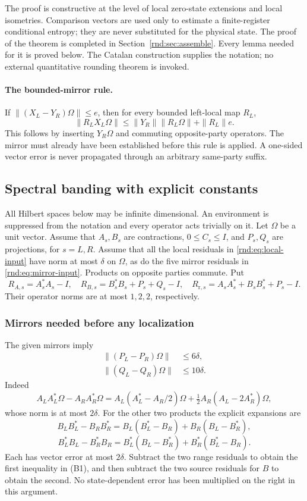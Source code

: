The proof is constructive at the level of local zero-state extensions and local isometries. Comparison vectors are used only to estimate a finite-register conditional entropy; they are never substituted for the physical state. The proof of the theorem is completed in Section~\ref{rnd:sec:assemble}. Every lemma needed for it is proved below. The Catalan construction supplies the notation; no external quantitative rounding theorem is invoked.

\paragraph{The bounded-mirror rule.}
If $\|(X_L-Y_R)\Omega\|\le e$, then for every bounded left-local map $R_L$,
\[
 \|R_LX_L\Omega\|\le\|Y_R\|\|R_L\Omega\|+\|R_L\|e.
\]
This follows by inserting $Y_R\Omega$ and commuting opposite-party operators. The mirror must already have been established before this rule is applied. A one-sided vector error is never propagated through an arbitrary same-party suffix.

\subsection{Spectral banding with explicit constants}
\label{rnd:sec:bands-explicit}

All Hilbert spaces below may be infinite dimensional.  An environment is
suppressed from the notation and every operator acts trivially on it.  Let
$\Omega$ be a unit vector.  Assume that $A_s,B_s$ are contractions,
$0\leq C_s\leq I$, and $P_s,Q_s$ are projections, for $s=L,R$.
Assume that all the local residuals in \eqref{rnd:eq:local-input} have norm at most
$\delta$ on $\Omega$, as do the five mirror residuals in \eqref{rnd:eq:mirror-input}.  Products on
opposite parties commute.  Put
\[
 R_{A,s}=A_s^*A_s-I,\quad
 R_{B,s}=B_s^*B_s+P_s+Q_s-I,\quad
 R_{\mathrm r,s}=A_sA_s^*+B_sB_s^*+P_s-I.
\]
Their operator norms are at most $1,2,2$, respectively.

\subsubsection{Mirrors needed before any localization}
The given mirrors imply
\begin{align}
 \|(P_L-P_R)\Omega\|&\leq6\delta,\\
 \|(Q_L-Q_R)\Omega\|&\leq10\delta.                 \tag{B1}
\end{align}
Indeed
\[
 A_LA_L^*\Omega-A_RA_R^*\Omega
 =A_L(A_L^*-A_R/2)\Omega
   +\tfrac12A_R(A_L-2A_R^*)\Omega,
\]
whose norm is at most $2\delta$.  For the other two products the explicit expansions are
\[
 B_LB_L^*-B_RB_R^*
 =B_L(B_L^*-B_R)+B_R(B_L-B_R^*),
\]
\[
 B_L^*B_L-B_R^*B_R
 =B_L^*(B_L-B_R^*)+B_R^*(B_L^*-B_R).
\]
Each has vector error at most $2\delta$.  Subtract the two range residuals
to obtain the first inequality in (B1), and then subtract the two source
residuals for $B$ to obtain the second.  No state-dependent error has been
multiplied on the right in this argument.

